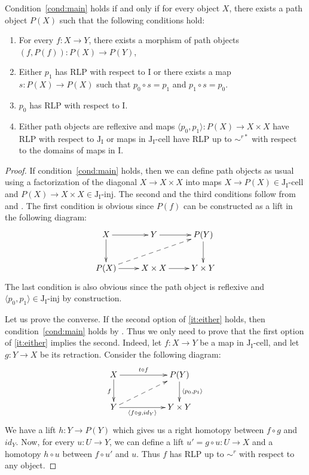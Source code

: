 \documentclass{tac}
\theoremstyle{definition}
\newcommand{\I}{\mathrm{I}}
\newcommand{\J}{\mathrm{J}}
\newcommand{\class}[2]{#1\text{-}\mathrm{#2}}
\newcommand{\Iinj}[1][\I]{\class{#1}{inj}}
\newcommand{\Icell}[1][\I]{\class{#1}{cell}}
\newcommand{\Jinj}[1][]{\Iinj[\J#1]}
\newcommand{\Jcell}[1][]{\Icell[\J#1]}
\begin{document}
\begin{prop}
Condition~\eqref{cond:main} holds if and only if for every object $X$,
there exists a path object $P(X)$ such that the following conditions hold:
\begin{enumerate}
\item For every $f : X \to Y$, there exists a morphism of path objects $(f,P(f)) : P(X) \to P(Y)$,
\item Either $p_1$ has RLP with respect to $\I$ or there exists a map $s : P(X) \to P(X)$ such that $p_0 \circ s = p_1$ and $p_1 \circ s = p_0$.
\item $p_0$ has RLP with respect to $\I$.
\item \label{it:either} Either path objects are reflexive and maps $\langle p_0, p_1 \rangle : P(X) \to X \times X$ have RLP with respect to $\J_\I$
or maps in $\Jcell[_\I]$ have RLP up to $\sim^{r*}$ with respect to the domains of maps in $\I$.
\end{enumerate}
\end{prop}
\begin{proof}
If condition~\eqref{cond:main} holds, then we can define path objects as usual using a factorization
of the diagonal $X \to X \times X$ into maps $X \to P(X) \in \Jcell[_\I]$ and $P(X) \to X \times X \in \Jinj[_\I]$.
The second and the third conditions follow from  and .
The first condition is obvious since $P(f)$ can be constructed as a lift in the following diagram:
\[ \xymatrix{ X \ar[r] \ar[d]            & Y \ar[r]          & P(Y) \ar[d] \\
              P(X) \ar[r] \ar@{-->}[urr] & X \times X \ar[r] & Y \times Y
            } \]
The last condition is also obvious since the path object is reflexive and $\langle p_0, p_1 \rangle \in \Jinj[_\I]$ by construction.

Let us prove the converse.
If the second option of \eqref{it:either} holds, then condition~\eqref{cond:main} holds by .
Thus we only need to prove that the first option of \eqref{it:either} implies the second.
Indeed, let $f : X \to Y$ be a map in $\Jcell[_\I]$, and let $g : Y \to X$ be its retraction.
Consider the following diagram:
\[ \xymatrix{ X \ar[rr]^-{t \circ f} \ar[d]_f & & P(Y) \ar[d]^{\langle p_0, p_1 \rangle} \\
              Y \ar[rr]_-{\langle f \circ g, id_Y \rangle} \ar@{-->}[urr] & & Y \times Y
            } \]
We have a lift $h : Y \to P(Y)$ which gives us a right homotopy between $f \circ g$ and $id_Y$.
Now, for every $u : U \to Y$, we can define a lift $u' = g \circ u : U \to X$ and a homotopy $h \circ u$ between $f \circ u'$ and $u$.
Thus $f$ has RLP up to $\sim^r$ with respect to any object.
\end{proof}
\end{document}
